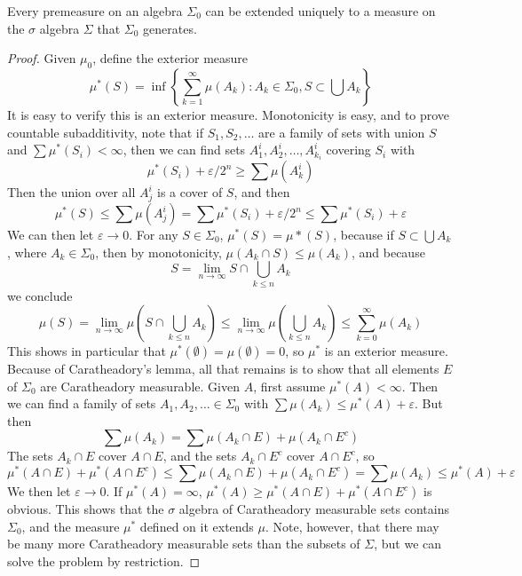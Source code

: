 \begin{theorem}
    Every premeasure on an algebra $\Sigma_0$ can be extended uniquely to a measure on the $\sigma$ algebra $\Sigma$ that $\Sigma_0$ generates.
\end{theorem}
\begin{proof}
    Given $\mu_0$, define the exterior measure
    \[ \mu^*(S) = \inf \left\{ \sum_{k = 1}^\infty \mu(A_k) : A_k \in \Sigma_0, S \subset \bigcup A_k \right\} \]
    It is easy to verify this is an exterior measure. Monotonicity is easy, and to prove countable subadditivity, note that if $S_1, S_2, \dots$ are a family of sets with union $S$ and $\sum \mu^*(S_i) < \infty$, then we can find sets $A^i_1, A^i_2, \dots, A^i_{k_i}$ covering $S_i$ with
    \[ \mu^*(S_i) + \varepsilon/2^n \geq \sum \mu(A^i_k) \]
    Then the union over all $A^i_j$ is a cover of $S$, and then
    \[ \mu^*(S) \leq \sum \mu(A^i_j) = \sum \mu^*(S_i) + \varepsilon/2^n \leq \sum \mu^*(S_i) + \varepsilon \]
    We can then let $\varepsilon \to 0$. For any $S \in \Sigma_0$, $\mu^*(S) = \mu*(S)$, because if $S \subset \bigcup A_k$, where $A_k \in \Sigma_0$, then by monotonicity, $\mu(A_k \cap S) \leq \mu(A_k)$, and because
    \[ S = \lim_{n \to \infty} S \cap \bigcup_{k \leq n} A_k \]
    we conclude
    \[ \mu(S) = \lim_{n \to \infty} \mu \left( S \cap \bigcup_{k \leq n} A_k \right) \leq \lim_{n \to \infty} \mu \left( \bigcup_{k \leq n} A_k \right) \leq \sum_{k = 0}^\infty \mu(A_k) \]
    This shows in particular that $\mu^*(\emptyset) = \mu(\emptyset) = 0$, so $\mu^*$ is an exterior measure. Because of Caratheadory's lemma, all that remains is to show that all elements $E$ of $\Sigma_0$ are Caratheadory measurable. Given $A$, first assume $\mu^*(A) < \infty$. Then we can find a family of sets $A_1, A_2, \dots \in \Sigma_0$ with $\sum \mu(A_k) \leq \mu^*(A) + \varepsilon$. But then
    \[ \sum \mu(A_k) = \sum \mu(A_k \cap E) + \mu(A_k \cap E^c) \]
    The sets $A_k \cap E$ cover $A \cap E$, and the sets $A_k \cap E^c$ cover $A \cap E^c$, so
    \[ \mu^*(A \cap E) + \mu^*(A \cap E^c) \leq \sum \mu(A_k \cap E) + \mu(A_k \cap E^c) = \sum \mu(A_k) \leq \mu^*(A) + \varepsilon \]
    We then let $\varepsilon \to 0$. If $\mu^*(A) = \infty$, $\mu^*(A) \geq \mu^*(A \cap E) + \mu^*(A \cap E^c)$ is obvious. This shows that the $\sigma$ algebra of Caratheadory measurable sets contains $\Sigma_0$, and the measure $\mu^*$ defined on it extends $\mu$. Note, however, that there may be many more Caratheadory measurable sets than the subsets of $\Sigma$, but we can solve the problem by restriction.
\end{proof}

